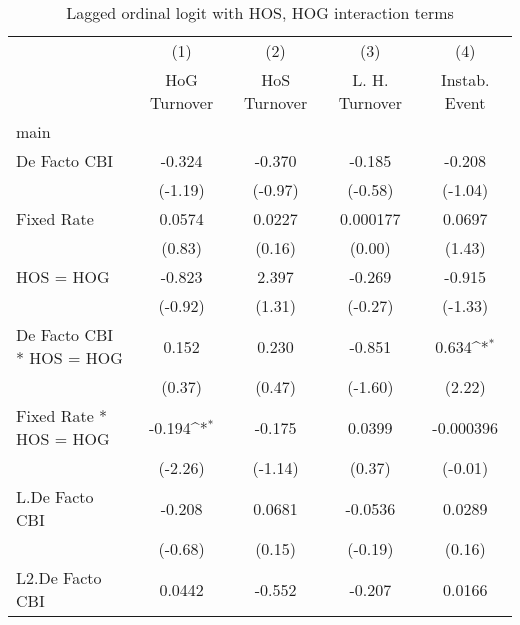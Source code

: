 {
\def\sym#1{\ifmmode^{#1}\else\(^{#1}\)\fi}
\begin{longtable}{l*{4}{c}}
\caption{Lagged ordinal logit with HOS, HOG interaction terms \label{hoshogintlagordLogLogDF}}\\
\hline\hline\endfirsthead\hline\endhead\hline\endfoot\endlastfoot
                &\multicolumn{1}{c}{(1)}&\multicolumn{1}{c}{(2)}&\multicolumn{1}{c}{(3)}&\multicolumn{1}{c}{(4)}\\
                &\multicolumn{1}{c}{HoG Turnover}&\multicolumn{1}{c}{HoS Turnover}&\multicolumn{1}{c}{L. H. Turnover}&\multicolumn{1}{c}{Instab. Event}\\
\hline
main            &                  &                  &                  &                  \\
De Facto CBI    &   -0.324         &   -0.370         &   -0.185         &   -0.208         \\
                &  (-1.19)         &  (-0.97)         &  (-0.58)         &  (-1.04)         \\
[1em]
Fixed Rate      &   0.0574         &   0.0227         & 0.000177         &   0.0697         \\
                &   (0.83)         &   (0.16)         &   (0.00)         &   (1.43)         \\
[1em]
HOS = HOG       &   -0.823         &    2.397         &   -0.269         &   -0.915         \\
                &  (-0.92)         &   (1.31)         &  (-0.27)         &  (-1.33)         \\
[1em]
De Facto CBI * HOS = HOG&    0.152         &    0.230         &   -0.851         &    0.634\sym{*}  \\
                &   (0.37)         &   (0.47)         &  (-1.60)         &   (2.22)         \\
[1em]
Fixed Rate * HOS = HOG&   -0.194\sym{*}  &   -0.175         &   0.0399         &-0.000396         \\
                &  (-2.26)         &  (-1.14)         &   (0.37)         &  (-0.01)         \\
[1em]
L.De Facto CBI  &   -0.208         &   0.0681         &  -0.0536         &   0.0289         \\
                &  (-0.68)         &   (0.15)         &  (-0.19)         &   (0.16)         \\
[1em]
L2.De Facto CBI &   0.0442         &   -0.552         &   -0.207         &   0.0166         \\

\end{longtable}}
